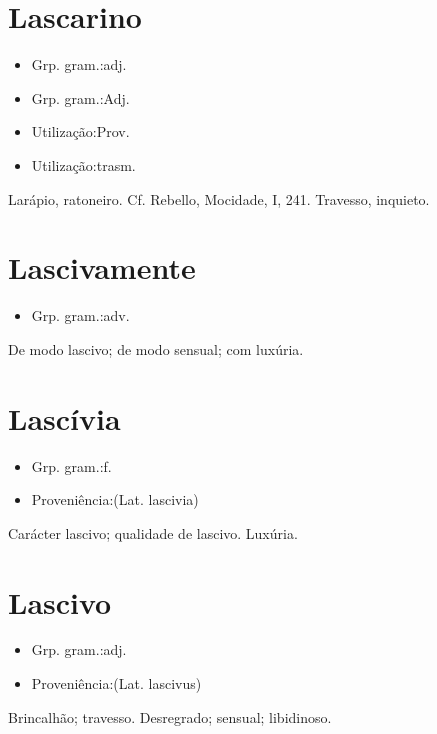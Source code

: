 \section{Lascarino}
\begin{itemize}
\item {Grp. gram.:adj.}
\end{itemize}
\begin{itemize}
\item {Grp. gram.:Adj.}
\end{itemize}
\begin{itemize}
\item {Utilização:Prov.}
\end{itemize}
\begin{itemize}
\item {Utilização:trasm.}
\end{itemize}
Larápio, ratoneiro. Cf. Rebello, \textunderscore Mocidade\textunderscore , I, 241.
Travesso, inquieto.
\section{Lascivamente}
\begin{itemize}
\item {Grp. gram.:adv.}
\end{itemize}
De modo lascivo; de modo sensual; com luxúria.
\section{Lascívia}
\begin{itemize}
\item {Grp. gram.:f.}
\end{itemize}
\begin{itemize}
\item {Proveniência:(Lat. \textunderscore lascivia\textunderscore )}
\end{itemize}
Carácter lascivo; qualidade de lascivo.
Luxúria.
\section{Lascivo}
\begin{itemize}
\item {Grp. gram.:adj.}
\end{itemize}
\begin{itemize}
\item {Proveniência:(Lat. \textunderscore lascivus\textunderscore )}
\end{itemize}
Brincalhão; travesso.
Desregrado; sensual; libidinoso.
